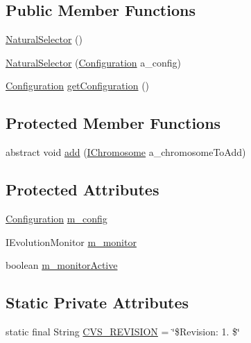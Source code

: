 \subsection*{Public Member Functions}
\begin{DoxyCompactItemize}
\item 
\hyperlink{classorg_1_1jgap_1_1_natural_selector_a3eb9d0041ece6e97945fa2a67cbef9a4}{Natural\-Selector} ()
\item 
\hyperlink{classorg_1_1jgap_1_1_natural_selector_abdf8ec5961eae78b4ab7c5e242a32d32}{Natural\-Selector} (\hyperlink{classorg_1_1jgap_1_1_configuration}{Configuration} a\-\_\-config)
\item 
\hyperlink{classorg_1_1jgap_1_1_configuration}{Configuration} \hyperlink{classorg_1_1jgap_1_1_natural_selector_a70fc78d093b52685eae39ffdb30b9ef4}{get\-Configuration} ()
\end{DoxyCompactItemize}
\subsection*{Protected Member Functions}
\begin{DoxyCompactItemize}
\item 
abstract void \hyperlink{classorg_1_1jgap_1_1_natural_selector_a889f35e483ad2b7590a4af17771b7ffa}{add} (\hyperlink{interfaceorg_1_1jgap_1_1_i_chromosome}{I\-Chromosome} a\-\_\-chromosome\-To\-Add)
\end{DoxyCompactItemize}
\subsection*{Protected Attributes}
\begin{DoxyCompactItemize}
\item 
\hyperlink{classorg_1_1jgap_1_1_configuration}{Configuration} \hyperlink{classorg_1_1jgap_1_1_natural_selector_ac8b1ddd06acc72b0e1d8e551729f46b3}{m\-\_\-config}
\item 
I\-Evolution\-Monitor \hyperlink{classorg_1_1jgap_1_1_natural_selector_a0ecc4abad2b9f2235e686113913dec17}{m\-\_\-monitor}
\item 
boolean \hyperlink{classorg_1_1jgap_1_1_natural_selector_a97b709b2715d76b87b3e15da6a22d5f8}{m\-\_\-monitor\-Active}
\end{DoxyCompactItemize}
\subsection*{Static Private Attributes}
\begin{DoxyCompactItemize}
\item 
static final String \hyperlink{classorg_1_1jgap_1_1_natural_selector_ae82aaa8c1ac8d50218d8178b1262d46c}{C\-V\-S\-\_\-\-R\-E\-V\-I\-S\-I\-O\-N} = \char`\"{}\$Revision\-: 1. \$\char`\"{}
\end{DoxyCompactItemize}
